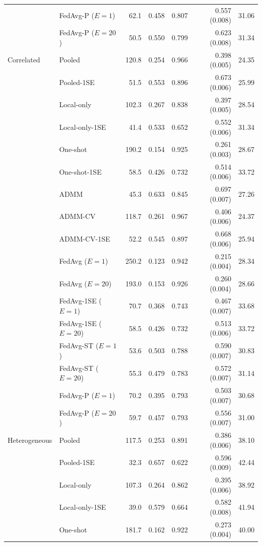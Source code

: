 \begin{longtable}{llrrrrr}
 & FedAvg-P ($E=1$) & 62.1 & 0.458 & 0.807 & 0.557 (0.008) & 31.06 \\
 & FedAvg-P ($E=20$) & 50.5 & 0.550 & 0.799 & 0.623 (0.008) & 31.34 \\
\midrule
Correlated & Pooled & 120.8 & 0.254 & 0.966 & 0.398 (0.005) & 24.35 \\
 & Pooled-1SE & 51.5 & 0.553 & 0.896 & 0.673 (0.006) & 25.99 \\
 & Local-only & 102.3 & 0.267 & 0.838 & 0.397 (0.005) & 28.54 \\
 & Local-only-1SE & 41.4 & 0.533 & 0.652 & 0.552 (0.006) & 31.34 \\
 & One-shot & 190.2 & 0.154 & 0.925 & 0.261 (0.003) & 28.67 \\
 & One-shot-1SE & 58.5 & 0.426 & 0.732 & 0.514 (0.006) & 33.72 \\
 & ADMM & 45.3 & 0.633 & 0.845 & 0.697 (0.007) & 27.26 \\
 & ADMM-CV & 118.7 & 0.261 & 0.967 & 0.406 (0.006) & 24.37 \\
 & ADMM-CV-1SE & 52.2 & 0.545 & 0.897 & 0.668 (0.006) & 25.94 \\
 & FedAvg ($E=1$) & 250.2 & 0.123 & 0.942 & 0.215 (0.004) & 28.34 \\
 & FedAvg ($E=20$) & 193.0 & 0.153 & 0.926 & 0.260 (0.004) & 28.66 \\
 & FedAvg-1SE ($E=1$) & 70.7 & 0.368 & 0.743 & 0.467 (0.007) & 33.68 \\
 & FedAvg-1SE ($E=20$) & 58.5 & 0.426 & 0.732 & 0.513 (0.006) & 33.72 \\
 & FedAvg-ST ($E=1$) & 53.6 & 0.503 & 0.788 & 0.590 (0.007) & 30.83 \\
 & FedAvg-ST ($E=20$) & 55.3 & 0.479 & 0.783 & 0.572 (0.007) & 31.14 \\
 & FedAvg-P ($E=1$) & 70.2 & 0.395 & 0.793 & 0.503 (0.007) & 30.68 \\
 & FedAvg-P ($E=20$) & 59.7 & 0.457 & 0.793 & 0.556 (0.007) & 31.00 \\
\midrule
Heterogeneous & Pooled & 117.5 & 0.253 & 0.891 & 0.386 (0.006) & 38.10 \\
 & Pooled-1SE & 32.3 & 0.657 & 0.622 & 0.596 (0.009) & 42.44 \\
 & Local-only & 107.3 & 0.264 & 0.862 & 0.395 (0.006) & 38.92 \\
 & Local-only-1SE & 39.0 & 0.579 & 0.664 & 0.582 (0.008) & 41.94 \\
 & One-shot & 181.7 & 0.162 & 0.922 & 0.273 (0.004) & 40.00 \\

\end{longtable}
